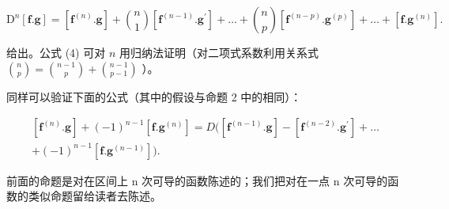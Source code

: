 \[
\mathrm{D} ^ {n} [ \mathbf {f}. \mathbf {g} ] = [ \mathbf {f} ^ {(n)}. \mathbf {g} ] + \binom {n} {1} [ \mathbf {f} ^ {(n - 1)}. \mathbf {g} ^ {\prime} ] + \dots + \binom {n} {p} [ \mathbf {f} ^ {(n - p)}. \mathbf {g} ^ {(p)} ] + \dots + [ \mathbf {f}. \mathbf {g} ^ {(n)} ].\tag{4}
\]

给出。公式 (4) 可对 \(n\) 用归纳法证明（对二项式系数利用关系式 \(\binom{n}{p} = \binom{n-1}{p} + \binom{n-1}{p-1}\) ）。

同样可以验证下面的公式（其中的假设与命题 2 中的相同）：

\[
\begin{array}{c} [ \mathbf {f} ^ {(n)}. \mathbf {g} ] + (- 1) ^ {n - 1} [ \mathbf {f}. \mathbf {g} ^ {(n)} ] = D \big ([ \mathbf {f} ^ {(n - 1)}. \mathbf {g} ] - [ \mathbf {f} ^ {(n - 2)}. \mathbf {g} ^ {\prime} ] + \dots \\ + (- 1) ^ {n - 1} [ \mathbf {f}. \mathbf {g} ^ {(n - 1)} ] \big). \end{array}\tag{5}
\]

前面的命题是对在区间上 n 次可导的函数陈述的；我们把对在一点 n 次可导的函数的类似命题留给读者去陈述。

